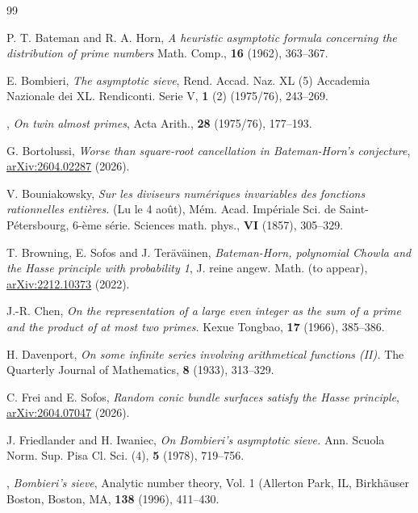 \documentclass[reqno, 11pt]{amsart}
\numberwithin{equation}{section}
\theoremstyle{definition}
\renewcommand{\emph}[1]{\textit{#1}}
\newcommand{\0}{\mathbf{0}}
\renewcommand{\#}{\sharp}
\begin{document}
 
 
\begin{thebibliography}{99}

 P. T. Bateman and R. A. Horn,
\emph{A heuristic asymptotic formula concerning the distribution of prime numbers} 
Math. Comp.,
{\bf 16} (1962), 363--367.

   E. Bombieri,
\emph{The asymptotic sieve}, 
Rend. Accad. Naz. XL (5)
Accademia Nazionale dei XL. Rendiconti. Serie V,
{\bf 1} (2) (1975/76), 243--269.

   \bysame,
\emph{On twin almost primes}, 
Acta Arith.,
{\bf 28} (1975/76), 177--193.


 G. Bortolussi,
\emph{Worse than square-root cancellation in Bateman-Horn's conjecture},
\href{https://arxiv.org/abs/2604.02287}{arXiv:2604.02287}
(2026).

 V. Bouniakowsky,
\emph{Sur les diviseurs numériques 
invariables des fonctions rationnelles
entières.}
(Lu le 4 août), Mém. Acad. Impériale Sci. de Saint-Pétersbourg, 6-ème série.
Sciences math. phys.,
{\bf VI} (1857), 305--329.





 T. Browning, E. Sofos and J. Ter{\"a}v{\"a}inen,
\emph{Bateman-Horn, polynomial Chowla and the Hasse principle with probability 1},
J. reine angew. Math. (to appear),
\href{https://arxiv.org/abs/2212.10373}{arXiv:2212.10373}
(2022).



J.-R. Chen,
\emph{On the representation of a large even integer as the sum of a prime and the
product of at most two primes.} 
Kexue Tongbao,
{\bf 17} (1966), 385--386.

 

 H. Davenport,
\emph{On some infinite series involving arithmetical functions (II).} 
The Quarterly Journal of Mathematics,
{\bf 8} (1933), 313--329.
 

 C. Frei and E. Sofos,
\emph{Random conic bundle surfaces satisfy the Hasse principle},
\href{https://arxiv.org/abs/2604.07047}{arXiv:2604.07047}
(2026).

 
  J. Friedlander and H. Iwaniec,
\emph{On {B}ombieri's asymptotic sieve.} 
Ann. Scuola Norm. Sup. Pisa Cl. Sci. (4),
{\bf 5} (1978), 719--756.


 \bysame,
\emph{Bombieri's sieve}, 
Analytic number theory, {V}ol. 1 ({A}llerton {P}ark, {IL},
Birkh\"{a}user Boston, Boston, MA,
{\bf 138} (1996), 411--430. 


\end{thebibliography}
\end{document}
